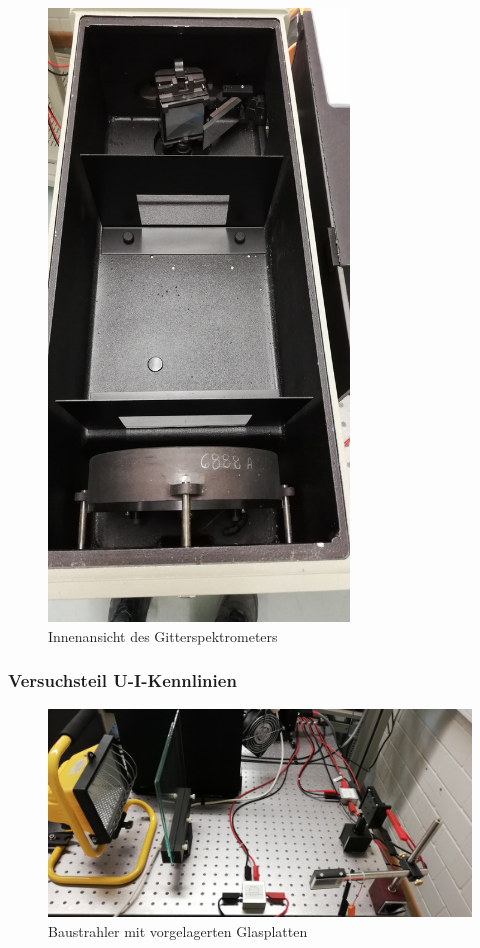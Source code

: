 \begin{figure}[h]
    \centering
    \includegraphics[width = 8cm]{Bilder/Aufbau4.jpg}
    \caption{Innenansicht des Gitterspektrometers}
\end{figure}
\clearpage


\subsubsection{Versuchsteil U-I-Kennlinien}

\begin{figure}[h]
    \centering
    \includegraphics[width = \linewidth]{Bilder/Aufbau1.jpg}
    \caption{Baustrahler mit vorgelagerten Glasplatten}
\end{figure}



